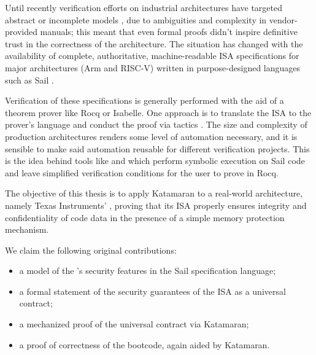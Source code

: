 Until recently verification efforts on industrial architectures have targeted abstract or incomplete models \cite{Georges2021}\cite{Jensen2013}\cite{Guanciale2016}, due to ambiguities and complexity in vendor-provided manuals; this meant that even formal proofs didn't inspire definitive trust in the correctness of the architecture. The situation has changed with the availability of complete, authoritative, machine-readable ISA specifications \cite{Armstrong2019} for major architectures (Arm and RISC-V) written in purpose-designed languages such as Sail \cite{Armstrong}.

Verification of these specifications is generally performed with the aid of a theorem prover like Rocq or Isabelle. One approach is to translate the ISA to the prover's language and conduct the proof via tactics \cite{Armstrong2019}\cite{Bauereiss2022}. The size and complexity of production architectures renders some level of automation necessary, and it is sensible to make said automation reusable for different verification projects. This is the idea behind tools like  \cite{Sammler2022} and  \cite{Huyghebaert2023} which perform symbolic execution on Sail code and leave simplified verification conditions for the user to prove in Rocq.



The objective of this thesis is to apply Katamaran to a real-world architecture, namely Texas Instruments' \msp, proving that its ISA properly ensures integrity and confidentiality of code data in the presence of a simple memory protection mechanism.

\noindent
We claim the following original contributions:
\begin{itemize}
\item a model of the \msp's security features in the Sail specification language;
\item a formal statement of the security guarantees of the ISA as a universal contract;
\item a mechanized proof of the universal contract via Katamaran;
\item a proof of correctness of the \msp bootcode, again aided by Katamaran.
\end{itemize}

